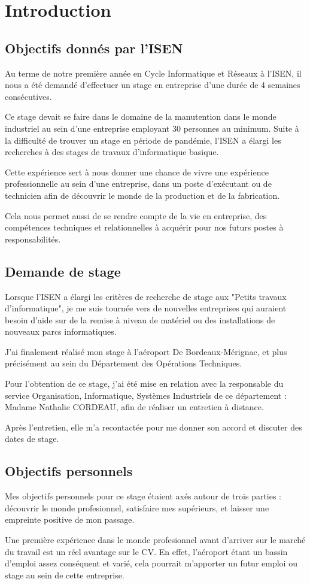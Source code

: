 \chapter{Introduction}

\section{Objectifs donnés par l'ISEN}


Au terme de notre première année en Cycle Informatique et Réseaux à l’ISEN, il nous a été demandé d’effectuer un stage en entreprise d’une durée de 4 semaines consécutives.


Ce stage devait se faire dans le domaine de la manutention dans le monde industriel au sein d’une entreprise employant 30 personnes au minimum. Suite à la difficulté de trouver un stage en période de pandémie, l’ISEN a élargi les recherches à des stages de travaux d’informatique basique.


Cette expérience sert à nous donner une chance de vivre une expérience professionnelle au sein d’une entreprise, dans un poste d’exécutant ou de technicien afin de découvrir le monde de la production et de la fabrication.


Cela nous permet aussi de se rendre compte de la vie en entreprise, des compétences techniques et relationnelles à acquérir pour nos futurs postes à responsabilités.


\section{Demande de stage}

Lorsque l’ISEN a élargi les critères de recherche de stage aux "Petits travaux d’informatique", je me suis tournée vers de nouvelles entreprises qui auraient besoin d’aide sur de la remise à niveau de matériel ou des installations de nouveaux parcs informatiques.


J’ai finalement réalisé mon stage à l’aéroport De Bordeaux-Mérignac, et plus précisément au sein du Département des Opérations Techniques.


Pour l’obtention de ce stage, j’ai été mise en relation avec la responsable du service Organisation, Informatique, Systèmes Industriels de ce département : Madame Nathalie CORDEAU, afin de réaliser un entretien à distance.

Après l’entretien, elle m'a recontactée pour me donner son accord et discuter des dates de stage.


\section{Objectifs personnels}

Mes objectifs personnels pour ce stage étaient axés autour de trois parties : découvrir le monde profesionnel, satisfaire mes supérieurs, et laisser une empreinte positive de mon passage.


Une première expérience dans le monde profesionnel avant d’arriver sur le marché du travail est un réel avantage sur le CV. En effet, l’aéroport étant un bassin d’emploi assez conséquent et varié, cela pourrait m’apporter un futur emploi ou stage au sein de cette entreprise.